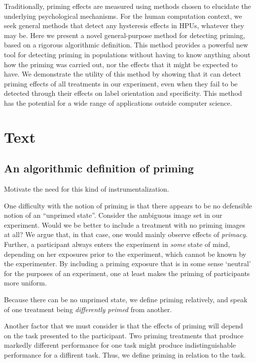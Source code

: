 \documentclass[a4paper]{report}
\begin{document}
Traditionally, priming effects are
measured using methods chosen to elucidate the underlying psychological 
mechanisms.  For the human computation context, we seek general 
methods that detect any hysteresis effects in HPUs, whatever they may be.  
Here we present a novel general-purpose method for detecting priming, based on 
a rigorous algorithmic definition. 
This method provides a powerful new tool for detecting priming in populations
without having to know anything about how the priming was carried out, nor the 
effects that it might be expected to have.
We demonstrate the utility of this method by showing that
it can detect priming effects of all treatments in our experiment, even when 
they fail to be detected through their effects on label orientation and 
specificity. This method has the potential for a wide range of applications 
outside computer science.  

\section*{Text}
\subsection*{An algorithmic definition of priming}
Motivate the need for this kind of instrumentalization.

One difficulty with the notion of priming is that there appears to be no 
defensible notion of an ``unprimed state''.  Consider the ambiguous image set 
in our experiment.  Would we be better to include a treatment with no
priming images at all?  We argue that, in that case, one would mainly observe  
effects of \textit{primacy}.  
Further, a participant always enters the experiment in \textit{some} state of 
mind, depending on her exposures prior to the experiment, which cannot be 
known by the experimenter.  By including a priming exposure that is in some 
sense `neutral' for the purposes of an experiment, one at least makes the 
priming of participants more uniform.  

Because there
can be no unprimed state, we define priming relatively, and speak of one
treatment being \textit{differently primed} from another.

Another factor that we must consider is that the effects of priming will
depend on the task presented to the participant.  Two priming treatments that
produce markedly different performance for one task might produce 
indistinguishable performance for a diffirent task.  Thus, we define priming
in relation to the task.
\end{document}

